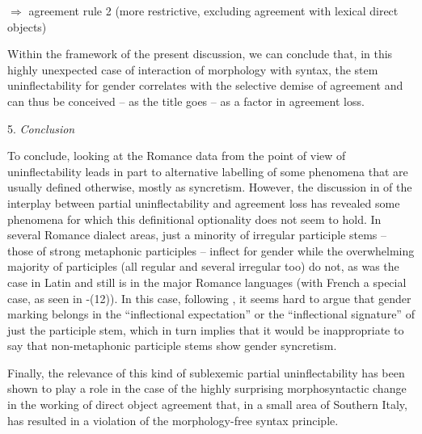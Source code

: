 \documentclass[output=paper]{langscibook}
\begin{document}
\begin{styleTabellaLUNGA}
    $\Rightarrow $ agreement rule 2 (more restrictive, excluding agreement with lexical direct objects)
\end{styleTabellaLUNGA}

Within the framework of the present discussion, we can conclude that, in this highly unexpected case of interaction of morphology with syntax, the stem uninflectability for gender correlates with the selective demise of agreement and can thus be conceived – as the title goes – as a factor in agreement loss.

5. \textit{Conclusion}

To conclude, looking at the Romance data from the point of view of uninflectability leads in part to alternative labelling of some phenomena that are usually defined otherwise, mostly as syncretism. However, the discussion in  of the interplay between partial uninflectability and agreement loss has revealed some phenomena for which this definitional optionality does not seem to hold. In several Romance dialect areas, just a minority of irregular participle stems – those of strong metaphonic participles – inflect for gender while the overwhelming majority of participles (all regular and several irregular too) do not, as was the case in Latin and still is in the major Romance languages (with French a special case, as seen in -(12)). In this case, following \citet[146]{Spencer2020}, it seems hard to argue that gender marking belongs in the “inflectional expectation” or the “inflectional signature” of just the participle stem, which in turn implies that it would be inappropriate to say that non-metaphonic participle stems show gender syncretism.

Finally, the relevance of this kind of sublexemic partial uninflectability has been shown to play a role in the case of the highly surprising morphosyntactic change in the working of direct object agreement that, in a small area of Southern Italy, has resulted in a violation of the morphology-free syntax principle.
\end{document}
